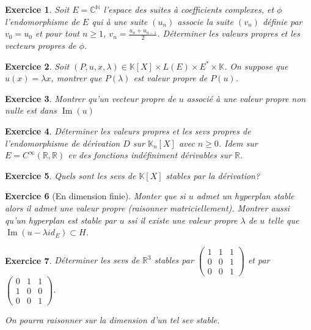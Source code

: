 \documentclass[12pt,a4paper]{article}
\newcommand{\R}{\mathbb{R}}
\newcommand{\K}{\mathbb{K} }
\DeclareMathOperator{\Ima }{Im}
\theoremstyle{break}
\theoremstyle{break}
\newtheorem{Exo}{Exercice}
\begin{document}


\begin{Exo}
	Soit $E=\mathbb C^\mathbb N$ l'espace des suites à coefficients complexes, et $\phi$ l'endomorphisme de $E$ qui à une suite $(u_n)$ associe la suite $(v_n)$ définie par $v_0=u_0$ et pour tout $n\geq 1$, 
	$v_n=\frac{u_n+u_{n-1}}2$.	Déterminer les valeurs propres et les vecteurs propres de $\phi$.
\end{Exo}

\begin{Exo}
	Soit $(P,u,x,\lambda)\in \K[X]\times L(E)\times E^*\times \K$. On suppose que $u(x)=\lambda x$, montrer que $P(\lambda)$ est valeur propre de $P(u)$.
\end{Exo}

\begin{Exo}
	Montrer qu'un vecteur propre de $u$ associé à une valeur propre non nulle est dans $\Ima(u)$
\end{Exo}

\begin{Exo}
	Déterminer les valeurs propres et les sevs propres de l'endomorphisme de dérivation $D$ sur $\K_n[X]$ avec $n\geqslant 0$. Idem sur $E=C^{\infty}(\R,\R)$ ev des fonctions indéfiniment dérivables sur $\R$.
\end{Exo}

\begin{Exo}
	Quels sont les sevs de $\mathbb{K}\left[ X\right] $ stables par la dérivation?
\end{Exo}


\begin{Exo}[En dimension finie]
	Monter que si $u$ admet un hyperplan stable	alors il admet une valeur propre (raisonner matriciellement). Montrer aussi qu'un hyperplan est stable par $u$ ssi il existe une valeur propre $\lambda$ de $u$ telle que $\Ima (u-\lambda id_E)\subset H$.
\end{Exo}


\begin{Exo}
		
	 D\'{e}terminer les sevs de $\R^3$ stables par $\left( 
	\begin{array}{lll}
		1 & 1 & 1 \\ 
		0 & 0 & 1 \\ 
		0 & 0 & 1%
	\end{array}%
	\right)$ et par $\begin{pmatrix}
		0 & 1 & 1 \\
		1 & 0 & 0 \\
		0 & 0 & 1
	\end{pmatrix}$.
	
On pourra raisonner sur la dimension d'un tel sev stable.
\end{Exo}
\end{document}
